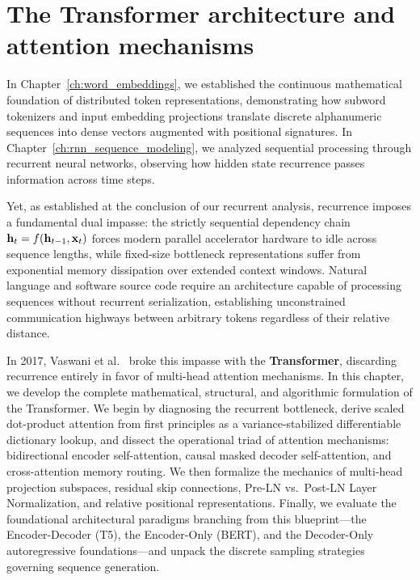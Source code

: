 \documentclass[../../main.tex]{subfiles}
\begin{document}
\chapter{The Transformer architecture and attention mechanisms}
\label{ch:transformer_architecture}

In Chapter~\ref{ch:word_embeddings}, we established the continuous mathematical foundation of distributed token representations, demonstrating how subword tokenizers and input embedding projections translate discrete alphanumeric sequences into dense vectors augmented with positional signatures. In Chapter~\ref{ch:rnn_sequence_modeling}, we analyzed sequential processing through recurrent neural networks, observing how hidden state recurrence passes information across time steps.

Yet, as established at the conclusion of our recurrent analysis, recurrence imposes a fundamental dual impasse: the strictly sequential dependency chain $\mathbf{h}_t = f(\mathbf{h}_{t-1}, \mathbf{x}_t)$ forces modern parallel accelerator hardware to idle across sequence lengths, while fixed-size bottleneck representations suffer from exponential memory dissipation over extended context windows. Natural language and software source code require an architecture capable of processing sequences without recurrent serialization, establishing unconstrained communication highways between arbitrary tokens regardless of their relative distance.

In 2017, Vaswani et al.~\cite{vaswani2017} broke this impasse with the \textbf{Transformer}, discarding recurrence entirely in favor of multi-head attention mechanisms. In this chapter, we develop the complete mathematical, structural, and algorithmic formulation of the Transformer. We begin by diagnosing the recurrent bottleneck, derive scaled dot-product attention from first principles as a variance-stabilized differentiable dictionary lookup, and dissect the operational triad of attention mechanisms: bidirectional encoder self-attention, causal masked decoder self-attention, and cross-attention memory routing. We then formalize the mechanics of multi-head projection subspaces, residual skip connections, Pre-LN vs.~Post-LN Layer Normalization, and relative positional representations. Finally, we evaluate the foundational architectural paradigms branching from this blueprint---the Encoder-Decoder (T5), the Encoder-Only (BERT), and the Decoder-Only autoregressive foundations---and unpack the discrete sampling strategies governing sequence generation.

\clearpage
\end{document}
